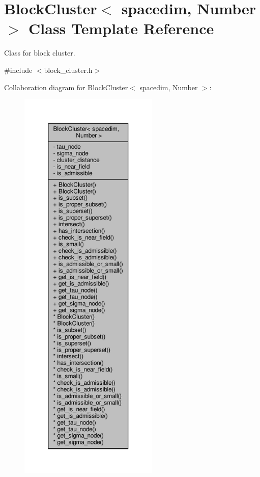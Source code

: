 \hypertarget{classBlockCluster}{}\section{Block\+Cluster$<$ spacedim, Number $>$ Class Template Reference}
\label{classBlockCluster}


Class for block cluster.  




{\ttfamily \#include $<$block\+\_\+cluster.\+h$>$}



Collaboration diagram for Block\+Cluster$<$ spacedim, Number $>$\+:\nopagebreak
\begin{figure}[H]
\begin{center}
\leavevmode
\includegraphics[height=550pt]{classBlockCluster__coll__graph}
\end{center}
\end{figure}
